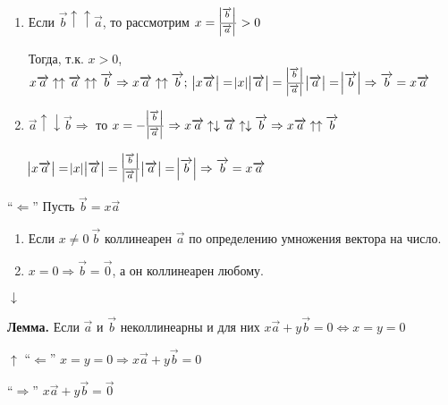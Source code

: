 \documentclass{article}
\begin{document}
    \begin{enumerate}
        \item Если \(\overrightarrow{b} \uparrow\uparrow \overrightarrow{a}\), то рассмотрим \( x = \frac{\abs{\overrightarrow{b}}}{\abs{\overrightarrow{a}}} > 0 \)
        
        Тогда, т.к. \(x > 0\), \(x\overrightarrow{a} \uparrow\uparrow \overrightarrow{a} \uparrow\uparrow \overrightarrow{b} \Rightarrow x\overrightarrow{a} \uparrow\uparrow \overrightarrow{b};\ \abs{x\overrightarrow{a}} = \abs{x}\abs{\overrightarrow{a}} = \frac{\abs{\overrightarrow{b}}}{\abs{\overrightarrow{a}}}\abs{\overrightarrow{a}} = \abs{\overrightarrow{b}} \Rightarrow \overrightarrow{b} = x\overrightarrow{a}\)
        \item \( \overrightarrow{a} \uparrow\downarrow \overrightarrow{b} \Rightarrow \) то \( x = -\frac{\abs{\overrightarrow{b}}}{\abs{\overrightarrow{a}}} \Rightarrow x\overrightarrow{a} \uparrow\downarrow \overrightarrow{a} \uparrow\downarrow \overrightarrow{b} \Rightarrow x\overrightarrow{a} \uparrow\uparrow \overrightarrow{b} \)
        
        \( \abs{x\overrightarrow{a}} = \abs{x}\abs{\overrightarrow{a}} = \frac{\abs{\overrightarrow{b}}}{\abs{\overrightarrow{a}}}\abs{\overrightarrow{a}} = \abs{\overrightarrow{b}} \Rightarrow \overrightarrow{b} = x\overrightarrow{a} \)
    \end{enumerate}
    
    ``\(\Leftarrow\)'' Пусть \(\overrightarrow{b} = x\overrightarrow{a}\)

    \begin{enumerate}
        \item Если \(x \neq 0\ \overrightarrow{b}\) коллинеарен \(\overrightarrow{a}\) по определению умножения вектора на число.
        \item \(x = 0 \Rightarrow \overrightarrow{b} = \overrightarrow{0}\), а он коллинеарен любому.
    \end{enumerate}

    \(\downarrow\)

    \textbf{Лемма.} Если \( \overrightarrow{a} \) и \( \overrightarrow{b} \) неколлинеарны и для них \( x\overrightarrow{a} + y\overrightarrow{b} = 0 \Leftrightarrow x = y = 0 \)

    \( \uparrow \) ``\(\Leftarrow\)'' \( x = y = 0 \Rightarrow x\overrightarrow{a} + y\overrightarrow{b} = 0 \)

    ``\( \Rightarrow \)'' \( x\overrightarrow{a} + y\overrightarrow{b} = \overrightarrow{0} \)
\end{document}
